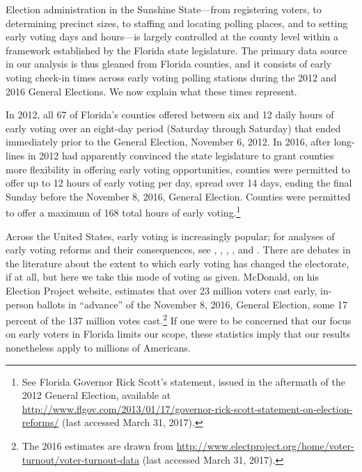 \documentclass[12pt,titlepage]{article}
\begin{document}
Election administration in the Sunshine State---from registering
voters, to determining precinct sizes, to staffing and locating
polling places, and to setting early voting days and hours---is
largely controlled at the county level within a framework established
by the Florida state legislature. The primary data source in our
analysis is thus gleaned from Florida counties, and it consists of
early voting check-in times across early voting polling stations
during the 2012 and 2016 General Elections.  We now explain what these
times represent.

In 2012, all 67 of Florida's counties offered between six and 12 daily
hours of early voting over an eight-day period (Saturday through
Saturday) that ended immediately prior to the General Election,
November 6, 2012.  In 2016, after long-lines in 2012 had apparently
convinced the state legislature to grant counties more flexibility in
offering early voting opportunities, counties were permitted to offer
up to 12 hours of early voting per day, spread over 14 days, ending
the final Sunday before the November 8, 2016, General Election.
Counties were permitted to offer a maximum of 168 total hours of early
voting.\footnote{See Florida Governor Rick Scott's statement, issued
  in the aftermath of the 2012 General Election, available at
  \url{http://www.flgov.com/2013/01/17/governor-rick-scott-statement-on-election-reforms/}
  (last accessed March 31, 2017).}

Across the United States, early voting is increasingly popular; for
analyses of early voting reforms and their consequences, see
\citet{neelyrichardson:earlyvoting},
\citet{gronke:earlyvotingreforms}, \citet{gronketoffey:psychological},
\citet{gronkebaum:growth}, and \citet{burdenetal:unanticipated}.
There are debates in the literature about the extent to which early
voting has changed the electorate, if at all, but here we take this
mode of voting as given.  McDonald, on his Election Project website,
estimates that over 23 million voters cast early, in-person ballots in
``advance'' of the November 8, 2016, General Election, some 17 percent
of the 137 million votes cast.\footnote{The 2016 estimates are drawn
  from
  \url{http://www.electproject.org/home/voter-turnout/voter-turnout-data}
  (last accessed March 31, 2017).}  If one were to be concerned that
our focus on early voters in Florida limits our scope, these
statistics imply that our results nonetheless apply to millions of
Americans.
\end{document}
